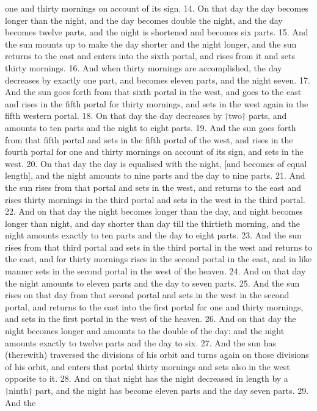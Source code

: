 one and thirty mornings on account of its sign. 14.
On that day the day becomes longer than the night,
and the day becomes double the night, and the day
becomes twelve parts, and the night is shortened and
becomes six parts. 15. And the sun mounts up to
make the day shorter and the night longer, and the
sun returns to the east and enters into the sixth portal,
and rises from it and sets thirty mornings. 16. And
when thirty mornings are accomplished, the day
decreases by exactly one part, and becomes eleven
parts, and the night seven. 17. And the sun goes
forth from that sixth portal in the west, and goes
to the east and rises in the fifth portal for thirty
mornings, and sets in the west again in the fifth
western portal. 18. On that day the day decreases
by †two† parts, and amounts to ten parts and the
night to eight parts. 19. And the sun goes forth
from that fifth portal and sets in the fifth portal of
the west, and rises in the fourth portal for one and
thirty mornings on account of its sign, and sets in
the west. 20. On that day the day is equalised with
the night, [and becomes of equal length], and the
night amounts to nine parts and the day to nine parts.
21. And the sun rises from that portal and sets in
the west, and returns to the east and rises thirty
mornings in the third portal and sets in the west in
the third portal. 22. And on that day the night
becomes longer than the day, and night becomes
longer than night, and day shorter than day till the
thirtieth morning, and the night amounts exactly
to ten parts and the day to eight parts. 23. And the
sun rises from that third portal and sets in the third
portal in the west and returns to the east, and for
thirty mornings rises in the second portal in the east,
and in like manner sets in the second portal in the
west of the heaven. 24. And on that day the night
amounts to eleven parts and the day to seven parts.
25. And the sun rises on that day from that second
portal and sets in the west in the second portal, and
returns to the east into the first portal for one and
thirty mornings, and sets in the first portal in the
west of the heaven. 26. And on that day the night
becomes longer and amounts to the double of the day:
and the night amounts exactly to twelve parts and the
day to six. 27. And the sun has (therewith) traversed
the divisions of his orbit and turns again on those
divisions of his orbit, and enters that portal thirty
mornings and sets also in the west opposite to it.
28. And on that night has the night decreased in
length by a †ninth† part, and the night has become
eleven parts and the day seven parts. 29. And the
